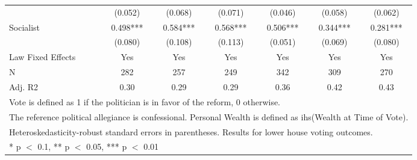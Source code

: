 \begin{table}[!h]
{\begin{tabular}[t]{lcccccc}
 & (\num{0.052}) & (\num{0.068}) & (\num{0.071}) & (\num{0.046}) & (\num{0.058}) & (\num{0.062})\\
Socialist & \num{0.498}*** & \num{0.584}*** & \num{0.568}*** & \num{0.506}*** & \num{0.344}*** & \num{0.281}***\\
 & (\num{0.080}) & (\num{0.108}) & (\num{0.113}) & (\num{0.051}) & (\num{0.069}) & (\num{0.080})\\
\midrule
Law Fixed Effects & Yes & Yes & Yes & Yes & Yes & Yes\\
N & \num{282} & \num{257} & \num{249} & \num{342} & \num{309} & \num{270}\\
Adj. R2 & \num{0.30} & \num{0.29} & \num{0.29} & \num{0.36} & \num{0.42} & \num{0.43}\\
\bottomrule
\multicolumn{7}{l}{\rule{0pt}{1em}Vote is defined as 1 if the politician is in favor of the reform, 0 otherwise.}\\
\multicolumn{7}{l}{\rule{0pt}{1em}The reference political allegiance is confessional. Personal Wealth is defined as ihs(Wealth at Time of Vote).}\\
\multicolumn{7}{l}{\rule{0pt}{1em}Heteroskedasticity-robust standard errors in parentheses. Results for lower house voting outcomes.}\\
\multicolumn{7}{l}{\rule{0pt}{1em}* p $<$ 0.1, ** p $<$ 0.05, *** p $<$ 0.01}\\
\end{tabular}}
\end{table}
